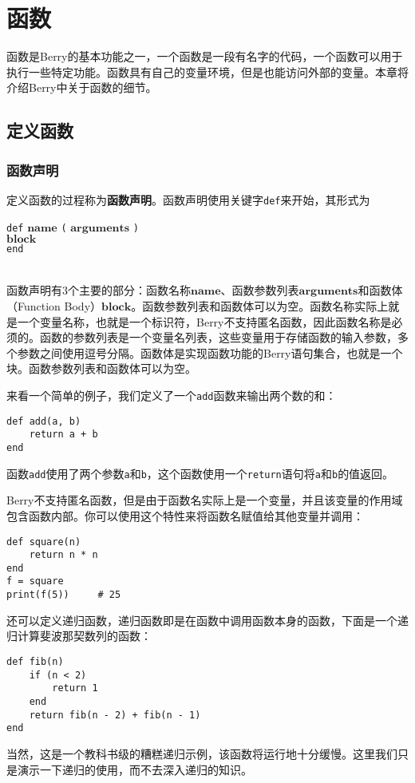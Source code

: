 \chapter{函数}

函数是Berry的基本功能之一，一个函数是一段有名字的代码，一个函数可以用于执行一些特定功能。函数具有自己的变量环境，但是也能访问外部的变量。本章将介绍Berry中关于函数的细节。

\section{定义函数}

\subsection{函数声明}

定义函数的过程称为\textbf{函数声明}。函数声明使用关键字\texttt{def}来开始，其形式为
\begin{algorithm}
    \texttt{def} $\bm{name}$ \texttt{(} $\bm{arguments}$ \texttt{)} \\
        \qquad $\bm{block}$ \\
    \texttt{end}
\end{algorithm}\vspace{-0.6em}\\
函数声明有3个主要的部分：函数名称$\bm{name}$、函数参数列表$\bm{arguments}$和函数体（Function Body）$\bm{block}$。函数参数列表和函数体可以为空。函数名称实际上就是一个变量名称，也就是一个标识符，Berry不支持匿名函数，因此函数名称是必须的。函数的参数列表是一个变量名列表，这些变量用于存储函数的输入参数，多个参数之间使用逗号分隔。函数体是实现函数功能的Berry语句集合，也就是一个块。函数参数列表和函数体可以为空。

来看一个简单的例子，我们定义了一个\texttt{add}函数来输出两个数的和：
\begin{lstlisting}[language=berry, numbers=none]
def add(a, b)
    return a + b
end
\end{lstlisting}

函数\texttt{add}使用了两个参数\texttt{a}和\texttt{b}，这个函数使用一个\texttt{return}语句将\texttt{a}和\texttt{b}的值返回。

Berry不支持匿名函数，但是由于函数名实际上是一个变量，并且该变量的作用域包含函数内部。你可以使用这个特性来将函数名赋值给其他变量并调用：
\begin{lstlisting}[language=berry, numbers=none]
def square(n)
    return n * n
end
f = square
print(f(5))     # 25
\end{lstlisting}
还可以定义递归函数，递归函数即是在函数中调用函数本身的函数，下面是一个递归计算斐波那契数列的函数：
\begin{lstlisting}[language=berry, numbers=none]
def fib(n)
    if (n < 2)
        return 1
    end
    return fib(n - 2) + fib(n - 1)
end
\end{lstlisting}
当然，这是一个教科书级的糟糕递归示例，该函数将运行地十分缓慢。这里我们只是演示一下递归的使用，而不去深入递归的知识。

